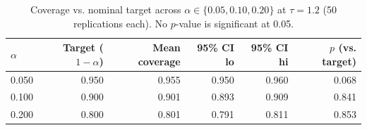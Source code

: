 \begin{table}[htbp]
\centering
\caption{Coverage vs. nominal target across $\alpha \in \{0.05, 0.10, 0.20\}$ at $\tau=1.2$ (50 replications each). No $p$-value is significant at 0.05.}
\label{tab:alpha-sensitivity}
\begin{tabular}{lrrrrr}
\toprule
$\alpha$ & Target ($1-\alpha$) & Mean coverage & 95\% CI lo & 95\% CI hi & $p$ (vs. target) \\
\midrule
0.050 & 0.950 & 0.955 & 0.950 & 0.960 & 0.068 \\
0.100 & 0.900 & 0.901 & 0.893 & 0.909 & 0.841 \\
0.200 & 0.800 & 0.801 & 0.791 & 0.811 & 0.853 \\
\bottomrule
\end{tabular}
\end{table}
